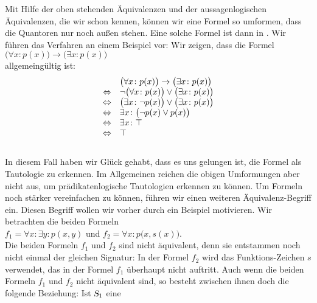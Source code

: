Mit Hilfe der oben stehenden Äquivalenzen und der aussagenlogischen Äquivalenzen, die wir schon kennen, können
wir eine Formel so umformen, dass die Quantoren nur noch außen stehen.  Eine solche Formel ist dann in
.  Wir führen das Verfahren an einem Beispiel vor: Wir
zeigen, dass die Formel  
\\[0.2cm]
\hspace*{1.3cm}
$\bigl(\forall x\colon p(x)\bigr) \rightarrow \bigl(\exists x\colon p(x)\bigr)$ 
\\[0.2cm]
allgemeingültig ist: 
$$ 
\begin{array}{ll}
                 & \bigl(\forall x\colon p(x)\bigr) \rightarrow \bigl(\exists x\colon p(x)\bigr)  \\
 \Leftrightarrow & \neg \bigl(\forall x\colon p(x)\bigr) \vee \bigl(\exists x\colon p(x)\bigr)    \\
 \Leftrightarrow & \bigl(\exists x\colon \neg p(x)\bigr) \vee \bigl(\exists x\colon p(x)\bigr)    \\
 \Leftrightarrow & \exists x\colon \bigl(\neg p(x) \vee p(x)\bigr) \\
 \Leftrightarrow & \exists x\colon \top                                                  \\
 \Leftrightarrow & \top                                                  \\
\end{array}
$$
\\[0.2cm]
In diesem Fall haben wir Glück gehabt, dass es uns gelungen ist, die Formel als Tautologie zu
erkennen.  Im Allgemeinen reichen die obigen Umformungen aber nicht aus, um prädikatenlogische
Tautologien erkennen zu können.  Um Formeln noch stärker vereinfachen zu können, 
führen wir einen weiteren Äquivalenz-Begriff ein.  Diesen Begriff wollen wir vorher durch ein Beispiel
motivieren.  Wir betrachten die beiden Formeln 
\\[0.2cm]
\hspace*{1.3cm} $f_1 = \forall x \colon \exists y \colon p(x,y)$ \quad und \quad $f_2 = \forall x \colon
p\bigl(x,s(x)\bigr)$.
\\[0.2cm]
Die beiden Formeln $f_1$ und $f_2$ sind nicht äquivalent, denn sie entstammen noch nicht
einmal der gleichen Signatur: In der Formel $f_2$ wird das Funktions-Zeichen $s$
verwendet, das in der Formel $f_1$ überhaupt nicht auftritt. 
Auch wenn die beiden Formeln $f_1$ und $f_2$ nicht äquivalent sind, so besteht zwischen
ihnen doch die folgende Beziehung:  Ist $\textsl{S}_1$ eine
